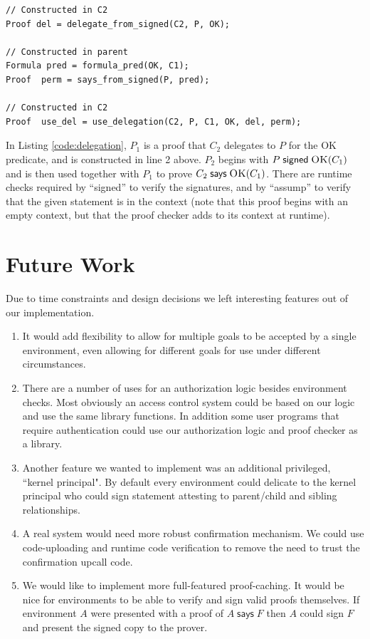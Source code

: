 \documentclass[10pt]{article}
\newcommand{\sign}[2]{\ensuremath{#1\;\textsf{signed}\;#2}}
\newcommand{\says}[2]{\ensuremath{#1\;\textsf{says}\;#2}}
\newcommand{\pred}[2]{\ensuremath{\textsc{#1}(#2)}}
\begin{document}
\begin{lstlisting}
// Constructed in C2
Proof del = delegate_from_signed(C2, P, OK);  

// Constructed in parent
Formula pred = formula_pred(OK, C1);
Proof  perm = says_from_signed(P, pred);

// Constructed in C2
Proof  use_del = use_delegation(C2, P, C1, OK, del, perm);
\end{lstlisting}
In Listing \ref{code:delegation}, $P_1$ is a proof that $C_2$ delegates to $P$ for the OK predicate, and is constructed in line 2 above.  $P_2$ begins with $\sign{P}{\pred{OK}{C_1}}$ and is then used together with $P_1$ to prove $\says{C_2}{\pred{OK}{C_1}}$.  There are runtime checks required by ``signed'' to verify the signatures, and by ``assump'' to verify that the given statement is in the context (note that this proof begins with an empty context, but that the proof checker adds to its context at runtime).  

\section{Future Work}
Due to time constraints and design decisions we left interesting features out of our implementation.  
\begin{enumerate}
\item It would add flexibility to allow for multiple goals to be accepted by a single environment, even allowing for different goals for use under different circumstances.  
\item There are a number of uses for an authorization logic besides environment checks.  Most obviously an access control system could be based on our logic and use the same library functions.  In addition some user programs that require authentication could use our authorization logic and proof checker as a library.  
\item Another feature we wanted to implement was an additional privileged, ``kernel principal".  By default every environment could delicate to the kernel principal who could sign statement attesting to parent/child and sibling relationships.
\item A real system would need more robust confirmation mechanism.  We could use code-uploading and runtime code verification to remove the need to trust the confirmation upcall code.
\item We would like to implement more full-featured proof-caching.  It would be nice for environments to be able to verify and sign valid proofs themselves.  If environment $A$ were presented with a proof of $\says{A}{F}$ then $A$ could sign $F$ and present the signed copy to the prover.
\end{enumerate}
\end{document}
